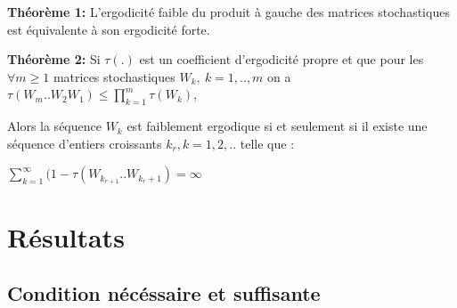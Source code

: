 \documentclass{beamer}
\begin{document}
\begin{frame}
	\textbf{Théorème 1:}
		L'ergodicité faible du produit à gauche des matrices stochastiques est équivalente à son ergodicité forte.
	\bigbreak
	
	\pause

	\textbf{Théorème 2:}
		Si $\tau(.)$ est un coefficient d'ergodicité propre et que pour les $\forall m \geq 1$ matrices stochastiques $W_k,\ k=1,..,m$ on a $\tau(W_m .. W_2W_1) \leq \prod_{k=1}^m\tau(W_k)$,
		
	\pause	
	\bigbreak		
		
		Alors la séquence $W_k$ est faiblement ergodique si et seulement si il existe une séquence d'entiers croissants $k_r, k=1,2,..$ telle que :

			\bigbreak
			
			$\sum_{k=1}^{\infty}(1 - \tau(W_{k_{r+1}}..W_{k_r + 1}) = \infty$

\end{frame}

\section{Résultats}

\subsection{Condition nécéssaire et suffisante}
\end{document}
